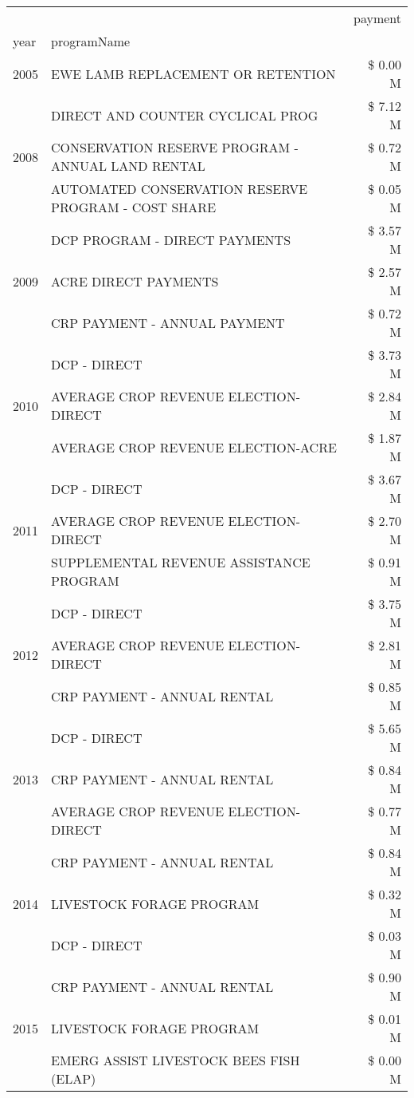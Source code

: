 \begin{tabular}{llr}
\toprule
 &  & payment \\
year & programName &  \\
\midrule
2005 & EWE LAMB REPLACEMENT OR RETENTION & \$ 0.00 M \\
\cline{1-3}
\multirow[t]{3}{*}{2008} & DIRECT AND COUNTER CYCLICAL PROG & \$ 7.12 M \\
 & CONSERVATION RESERVE PROGRAM - ANNUAL LAND RENTAL & \$ 0.72 M \\
 & AUTOMATED CONSERVATION RESERVE PROGRAM - COST SHARE & \$ 0.05 M \\
\cline{1-3}
\multirow[t]{3}{*}{2009} & DCP PROGRAM - DIRECT PAYMENTS & \$ 3.57 M \\
 & ACRE DIRECT PAYMENTS & \$ 2.57 M \\
 & CRP PAYMENT - ANNUAL PAYMENT & \$ 0.72 M \\
\cline{1-3}
\multirow[t]{3}{*}{2010} & DCP - DIRECT & \$ 3.73 M \\
 & AVERAGE CROP REVENUE ELECTION-DIRECT & \$ 2.84 M \\
 & AVERAGE CROP REVENUE ELECTION-ACRE & \$ 1.87 M \\
\cline{1-3}
\multirow[t]{3}{*}{2011} & DCP - DIRECT & \$ 3.67 M \\
 & AVERAGE CROP REVENUE ELECTION-DIRECT & \$ 2.70 M \\
 & SUPPLEMENTAL REVENUE ASSISTANCE PROGRAM & \$ 0.91 M \\
\cline{1-3}
\multirow[t]{3}{*}{2012} & DCP - DIRECT & \$ 3.75 M \\
 & AVERAGE CROP REVENUE ELECTION-DIRECT & \$ 2.81 M \\
 & CRP PAYMENT - ANNUAL RENTAL & \$ 0.85 M \\
\cline{1-3}
\multirow[t]{3}{*}{2013} & DCP - DIRECT & \$ 5.65 M \\
 & CRP PAYMENT - ANNUAL RENTAL & \$ 0.84 M \\
 & AVERAGE CROP REVENUE ELECTION-DIRECT & \$ 0.77 M \\
\cline{1-3}
\multirow[t]{3}{*}{2014} & CRP PAYMENT - ANNUAL RENTAL & \$ 0.84 M \\
 & LIVESTOCK FORAGE PROGRAM & \$ 0.32 M \\
 & DCP - DIRECT & \$ 0.03 M \\
\cline{1-3}
\multirow[t]{3}{*}{2015} & CRP PAYMENT - ANNUAL RENTAL & \$ 0.90 M \\
 & LIVESTOCK FORAGE PROGRAM & \$ 0.01 M \\
 & EMERG ASSIST LIVESTOCK BEES FISH (ELAP) & \$ 0.00 M \\

\end{tabular}
